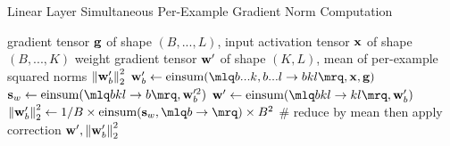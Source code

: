 \begin{algorithm}
\caption{Linear Layer Simultaneous Per-Example Gradient Norm Computation}
\label{alg:linear-layer}
\begin{algorithmic}[1]
\Require gradient tensor $\mathbf{g}$ of shape $(B, ..., L)$, input activation tensor $\mathbf{x}$ of shape $(B, ..., K)$
\Ensure weight gradient tensor $\mathbf{w}'$ of shape $(K, L)$, mean of per-example squared norms $\left\lVert\mathbf{w}_b'\right\rVert_2^2$
\State $\wB_b' \gets \text{einsum}(\mlq b...k,b...l \rightarrow bkl \mrq, \xB, \gB)$
\State $\mathbf{s}_{w} \gets \text{einsum}(\mlq b k l \rightarrow b \mrq, \wB_b'^2)$
\State $\wB' \gets \text{einsum}(\mlq b k l \rightarrow k l \mrq, \wB_b')$
\State $\sqn{\wB_b'} \gets 1/B \times \text{einsum}(\mathbf{s}_w, \mlq b \rightarrow \mrq) \times B^2$ \# reduce by mean then apply correction
\State \Return $\mathbf{w}', \left\lVert\mathbf{w}_b'\right\rVert_2^2$
\end{algorithmic}
\end{algorithm}

